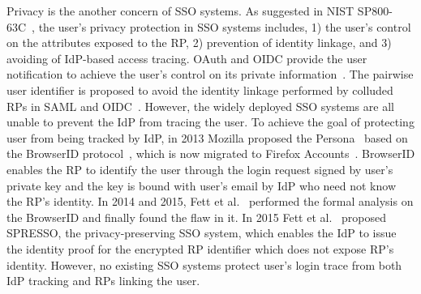 Privacy is the another concern of  SSO systems.
As suggested in NIST SP800-63C~\cite{NIST2017draft}, the user's privacy protection in SSO systems includes, 1) the user's control on the attributes exposed to the RP, 2) prevention of identity linkage, and 3) avoiding of IdP-based access tracing. 
OAuth and OIDC provide the user notification to achieve the user's control on its private information~\cite{ChenPCTKT14,YangLLZH16}.
The pairwise user identifier is proposed to avoid the identity linkage performed by colluded RPs in SAML and OIDC~\cite{OpenIDConnect,SAML}. 
However, the widely deployed SSO systems are all unable to prevent the IdP from tracing the user. To achieve the goal of protecting user from being tracked by IdP, in 2013 Mozilla proposed the Persona~\cite{persona} based on the BrowserID protocol~\cite{BrowserID}, which is now migrated to Firefox Accounts~\cite{FirefoxAccount}. BrowserID enables the RP to identify the user through the login request signed by user's private key and the key is bound with user's email by IdP who need not know the  RP's identity. In 2014 and 2015, Fett et al.~\cite{FettKS14, BrowserID} performed the formal analysis on the BrowserID and finally found the flaw in it. In 2015 Fett et al.~\cite{SPRESSO} proposed SPRESSO, the privacy-preserving SSO system, which enables the IdP to issue the identity proof for the encrypted RP identifier which does not expose RP's identity. However, no existing SSO systems protect user's login trace from both IdP tracking and RPs linking the user.

